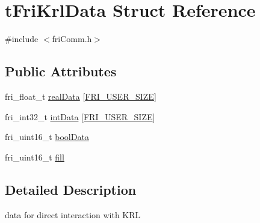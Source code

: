 \hypertarget{structtFriKrlData}{\section{t\-Fri\-Krl\-Data \-Struct \-Reference}
\label{structtFriKrlData}
}


{\ttfamily \#include $<$fri\-Comm.\-h$>$}

\subsection*{\-Public \-Attributes}
\begin{DoxyCompactItemize}
\item 
fri\-\_\-float\-\_\-t \hyperlink{structtFriKrlData_a37c8e709e61d9aec2f21819eb11273b6}{real\-Data} \mbox{[}\hyperlink{friComm_8h_a13e11c9bed07772e46a3369a1ab8a678}{\-F\-R\-I\-\_\-\-U\-S\-E\-R\-\_\-\-S\-I\-Z\-E}\mbox{]}
\item 
fri\-\_\-int32\-\_\-t \hyperlink{structtFriKrlData_adb5fa3951c21c906e3c932b0a4a7a7ef}{int\-Data} \mbox{[}\hyperlink{friComm_8h_a13e11c9bed07772e46a3369a1ab8a678}{\-F\-R\-I\-\_\-\-U\-S\-E\-R\-\_\-\-S\-I\-Z\-E}\mbox{]}
\item 
fri\-\_\-uint16\-\_\-t \hyperlink{structtFriKrlData_a2a8350a056d472aef8ce412e8787a335}{bool\-Data}
\item 
fri\-\_\-uint16\-\_\-t \hyperlink{structtFriKrlData_acf2a4fbe1ae60e058931565bb5858574}{fill}
\end{DoxyCompactItemize}


\subsection{\-Detailed \-Description}
data for direct interaction with \-K\-R\-L 

